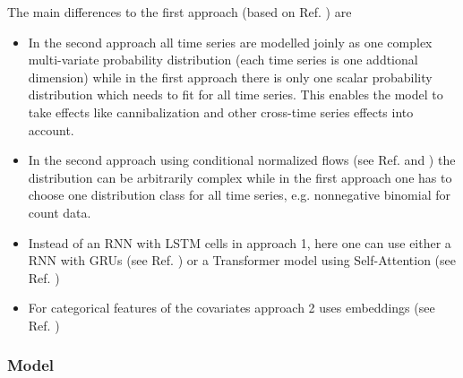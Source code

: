 \documentclass[11pt,headings=small]{scrartcl}
\begin{document}
The main differences to the first approach (based on Ref. \cite{SALINAS20201181}) are
\begin{itemize}
	\item In the second approach all time series are modelled joinly as one complex multi-variate probability distribution (each time series is one addtional dimension) while in the first approach there is only one scalar probability distribution which needs to fit for all time series. This enables the model to take effects like cannibalization and other cross-time series effects into account.
	\item In the second approach using conditional normalized flows (see Ref. \cite{papamakarios2018masked} and \cite{DBLP:journals/corr/DinhSB16}) the distribution can be arbitrarily complex while in the first approach one has to choose one distribution class for all time series, e.g. nonnegative binomial for count data.
	\item Instead of an RNN with LSTM cells in approach 1, here one can use either a RNN with GRUs (see Ref. \cite{DBLP:journals/corr/ChungGCB14}) or a Transformer model using Self-Attention (see Ref. \cite{DBLP:journals/corr/VaswaniSPUJGKP17})
	\item For categorical features of the covariates approach 2 uses embeddings (see Ref. \cite{DBLP:journals/corr/GuoB16})
\end{itemize}

\subsubsection{Model}
\label{subsection:approach2model}
\end{document}
